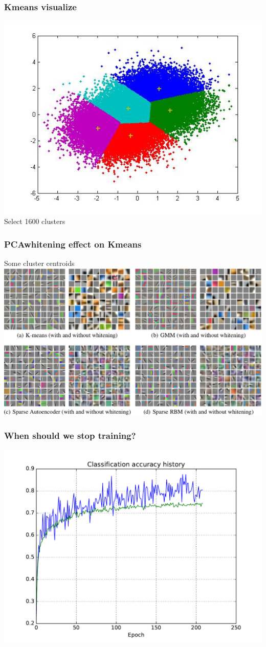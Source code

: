 \documentclass{beamer}
\begin{document}
\begin{frame}
\frametitle{Kmeans visualize}
\includegraphics[width=.8\textwidth]{kmeans.jpg}\\
Select 1600 clusters
\end{frame}

\begin{frame}
\frametitle{PCAwhitening effect on Kmeans}
Some cluster centroids
\includegraphics[width=\textwidth]{whiten.png}

\end{frame}
\begin{frame}
\frametitle{When should we stop training?}
\includegraphics[width=.9\textwidth]{kmeans_acc-eps-converted-to.pdf}
\end{frame}
\end{document}

